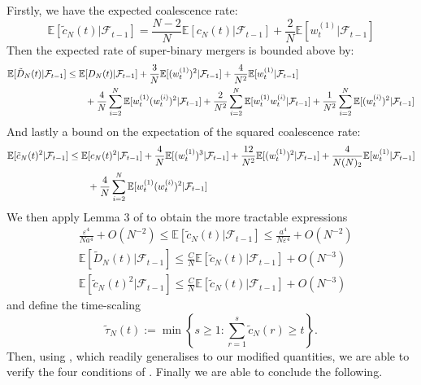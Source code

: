 \documentclass[fleqn]{article}
\theoremstyle{definition}
\newcommand{\E}{\mathbb{E}}
\newcommand{\F}{\mathcal{F}_{t-1}}
\newcommand{\wt}[2][t]{w_{#1}^{(#2)}}
\begin{document}
Firstly, we have the expected coalescence rate:
\begin{equation}\label{eq:cNtilde}
\E[\tilde{c}_N(t) |\F] = \frac{N-2}{N} \E[c_N(t) |\F] + \frac{2}{N} \E[\wt{1} |\F]
\end{equation}
Then the expected rate of super-binary mergers is bounded above by:
\begin{align}\label{eq:DNtilde}
\E[\tilde{D}_N(t) |\F] 
&\leq \E[D_N(t) |\F] + \frac{3}{N} \E[(\wt{1})^2 |\F] +  \frac{4}{N^2}\E[\wt{1} |\F] \notag\\
&\qquad+ \frac{4}{N}\sum_{i=2}^N \E[\wt{1}(\wt{i})^2 |\F] +\frac{2}{N^2}\sum_{i=2}^N \E[\wt{1}\wt{i} |\F] + \frac{1}{N^2} \sum_{i=2}^N \E[(\wt{i})^2 |\F] 
\end{align}
And lastly a bound on the expectation of the squared coalescence rate:
\begin{align}\label{eq:cNtilde2}
\E[\tilde{c}_N(t)^2 |\F] 
&\leq \E[c_N(t)^2 |\F] + \frac{4}{N}\E[(\wt{1})^3 |\F] + \frac{12}{N^2} \E[(\wt{1})^2 |\F] + \frac{4}{N(N)_2} \E[\wt{1} |\F] \notag\\
&\qquad + \frac{4}{N} \sum_{i=2}^N \E[\wt{1}(\wt{i})^2 |\F]
\end{align}
We then apply Lemma 3 of \citet{koskela2018} to obtain the more tractable expressions
\begin{align*}
& \frac{\varepsilon^4}{Na^4} + O(N^{-2}) \leq \E[\tilde{c}_N(t) |\F]  \leq \frac{a^4}{N\varepsilon^4} + O(N^{-2}) \\
& \E[\tilde{D}_N(t) |\F] \leq \frac{C}{N} \E[\tilde{c}_N(t) |\F] + O(N^{-3}) \\
& \E[\tilde{c}_N(t)^2 |\F] \leq \frac{C}{N} \E[\tilde{c}_N(t) |\F] + O(N^{-3})
\end{align*}
and define the time-scaling
\begin{equation}\label{eq:tau_tilde}
\tilde{\tau}_N(t) := \min\left\{ s\geq 1 : \sum_{r=1}^s \tilde{c}_N(r) \geq t \right\}.
\end{equation}
Then, using \citet[Lemma 2]{koskela2018}, which readily generalises to our modified quantities, we are able to verify the four conditions of \citet[Theorem 1]{koskela2018}. Finally we are able to conclude the following.
\end{document}
